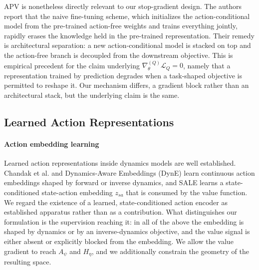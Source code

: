 ﻿\documentclass{article}
\begin{document}
APV is nonetheless directly relevant to our stop-gradient design. The authors
report that the naive fine-tuning scheme, which initializes the action-conditional
model from the pre-trained action-free weights and trains everything jointly,
rapidly erases the knowledge held in the pre-trained representation. Their remedy
is architectural separation: a new action-conditional model is stacked on top and
the action-free branch is decoupled from the downstream objective. This is
empirical precedent for the claim underlying $\nabla_{\theta}^{(Q)}\mathcal{L}_Q = 0$,
namely that a representation trained by prediction degrades when a task-shaped
objective is permitted to reshape it. Our mechanism differs, a gradient block
rather than an architectural stack, but the underlying claim is the same.

\subsection{Learned Action Representations}

\paragraph{Action embedding learning}
Learned action representations inside dynamics models are well established.
Chandak et al. and Dynamics-Aware Embeddings (DynE) learn continuous action
embeddings shaped by forward or inverse dynamics, and SALE learns a
state-conditioned state-action embedding $z_{sa}$ that is consumed by the value
function. We regard the existence of a learned, state-conditioned action encoder
as established apparatus rather than as a contribution. What distinguishes our
formulation is the supervision reaching it: in all of the above the embedding is
shaped by dynamics or by an inverse-dynamics objective, and the value signal is
either absent or explicitly blocked from the embedding. We allow the value
gradient to reach $A_\psi$ and $H_\eta$, and we additionally constrain the
geometry of the resulting space.
\end{document}
